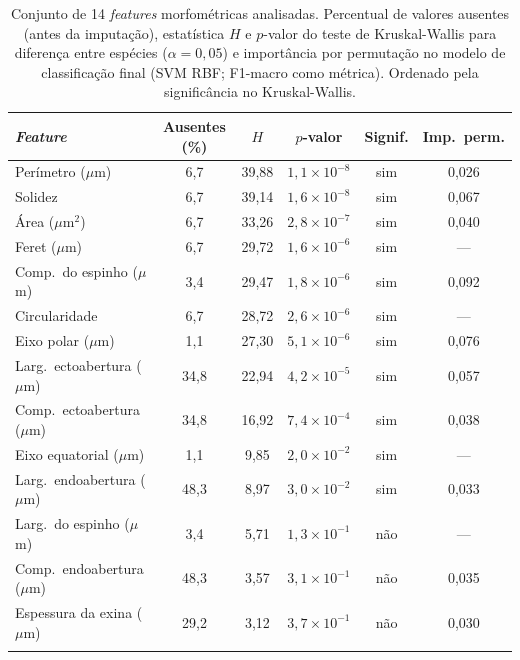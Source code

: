 
\begin{table}[htbp]
\caption{Conjunto de 14 \textit{features} morfométricas analisadas. Percentual de valores ausentes (antes da imputação), estatística $H$ e $p$-valor do teste de Kruskal-Wallis para diferença entre espécies ($\alpha = 0{,}05$) e importância por permutação no modelo de classificação final (SVM RBF; F1-macro como métrica). Ordenado pela significância no Kruskal-Wallis.}\label{tab:features}
\small
\begin{tabular*}{\textwidth}{@{\extracolsep\fill}lccccc@{}}
\toprule
\textit{Feature} & Ausentes (\%) & $H$ & $p$-valor & Signif. & Imp.\ perm. \\
\midrule
Perímetro ($\mu$m)            & 6{,}7  & 39{,}88 & $1{,}1\times10^{-8}$ & sim & 0{,}026 \\
Solidez                        & 6{,}7  & 39{,}14 & $1{,}6\times10^{-8}$ & sim & 0{,}067 \\
Área ($\mu$m$^2$)              & 6{,}7  & 33{,}26 & $2{,}8\times10^{-7}$ & sim & 0{,}040 \\
Feret ($\mu$m)                 & 6{,}7  & 29{,}72 & $1{,}6\times10^{-6}$ & sim & --- \\
Comp.\ do espinho ($\mu$m)     & 3{,}4  & 29{,}47 & $1{,}8\times10^{-6}$ & sim & 0{,}092 \\
Circularidade                  & 6{,}7  & 28{,}72 & $2{,}6\times10^{-6}$ & sim & --- \\
Eixo polar ($\mu$m)            & 1{,}1  & 27{,}30 & $5{,}1\times10^{-6}$ & sim & 0{,}076 \\
Larg.\ ectoabertura ($\mu$m)   & 34{,}8 & 22{,}94 & $4{,}2\times10^{-5}$ & sim & 0{,}057 \\
Comp.\ ectoabertura ($\mu$m)   & 34{,}8 & 16{,}92 & $7{,}4\times10^{-4}$ & sim & 0{,}038 \\
Eixo equatorial ($\mu$m)       & 1{,}1  & 9{,}85  & $2{,}0\times10^{-2}$ & sim & --- \\
Larg.\ endoabertura ($\mu$m)   & 48{,}3 & 8{,}97  & $3{,}0\times10^{-2}$ & sim & 0{,}033 \\
Larg.\ do espinho ($\mu$m)     & 3{,}4  & 5{,}71  & $1{,}3\times10^{-1}$ & não & --- \\
Comp.\ endoabertura ($\mu$m)   & 48{,}3 & 3{,}57  & $3{,}1\times10^{-1}$ & não & 0{,}035 \\
Espessura da exina ($\mu$m)    & 29{,}2 & 3{,}12  & $3{,}7\times10^{-1}$ & não & 0{,}030 \\
\botrule
\end{tabular*}
\end{table}
